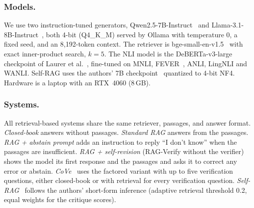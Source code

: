 \documentclass{svproc}
\begin{document}
\subsubsection{Models.} We use two instruction-tuned generators, Qwen2.5-7B-Instruct~\cite{qwen2024qwen25} and Llama-3.1-8B-Instruct~\cite{dubey2024llama3}, both 4-bit (Q4\_K\_M) served by Ollama with temperature 0, a fixed seed, and an 8{,}192-token context. The retriever is bge-small-en-v1.5~\cite{xiao2023cpack} with exact inner-product search, $k=5$. The NLI model is the DeBERTa-v3-large~\cite{he2021debertav3} checkpoint of Laurer et al.~\cite{laurer2023nli}, fine-tuned on MNLI, FEVER~\cite{thorne2018fever}, ANLI, LingNLI and WANLI. Self-RAG uses the authors' 7B checkpoint~\cite{asai2023selfrag} quantized to 4-bit NF4. Hardware is a laptop with an RTX~4060 (8\,GB).

\subsubsection{Systems.} All retrieval-based systems share the same retriever, passages, and answer format. \emph{Closed-book} answers without passages. \emph{Standard RAG} answers from the passages. \emph{RAG + abstain prompt} adds an instruction to reply ``I don't know'' when the passages are insufficient. \emph{RAG + self-revision} (RAG-Verify without the verifier) shows the model its first response and the passages and asks it to correct any error or abstain. \emph{CoVe}~\cite{dhuliawala2023cove} uses the factored variant with up to five verification questions, either closed-book or with retrieval for every verification question. \emph{Self-RAG}~\cite{asai2023selfrag} follows the authors' short-form inference (adaptive retrieval threshold 0.2, equal weights for the critique scores).
\end{document}
